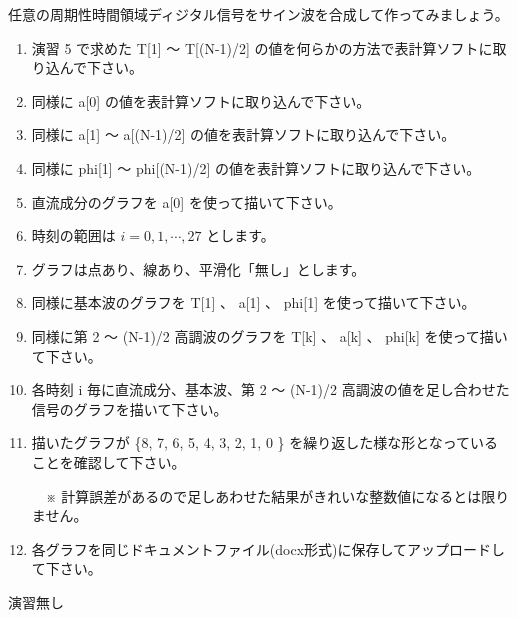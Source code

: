 \documentclass[a4paper]{jarticle}
\begin{document}
 任意の周期性時間領域ディジタル信号をサイン波を合成して作ってみましょう。\par
\vspace{1zh}
\begin{enumerate}
\item 演習 5 で求めた T[1] 〜 T[(N-1)/2] の値を何らかの方法で表計算ソフトに取り込んで下さい。
\item 同様に a[0] の値を表計算ソフトに取り込んで下さい。
\item 同様に a[1] 〜 a[(N-1)/2] の値を表計算ソフトに取り込んで下さい。
\item 同様に phi[1] 〜 phi[(N-1)/2] の値を表計算ソフトに取り込んで下さい。
\item 直流成分のグラフを a[0] を使って描いて下さい。
\item 時刻の範囲は $i = 0, 1,  \cdots, 27$ とします。
\item グラフは点あり、線あり、平滑化「無し」とします。
\item 同様に基本波のグラフを T[1] 、 a[1] 、 phi[1] を使って描いて下さい。
\item 同様に第 2 〜 (N-1)/2 高調波のグラフを T[k] 、 a[k] 、 phi[k] を使って描いて下さい。
\item 各時刻 i 毎に直流成分、基本波、第 2 〜 (N-1)/2 高調波の値を足し合わせた信号のグラフを描いて下さい。
\item 描いたグラフが \{8, 7, 6, 5, 4, 3, 2, 1, 0 \} を繰り返した様な形となっていることを確認して下さい。\par
　※ 計算誤差があるので足しあわせた結果がきれいな整数値になるとは限りません。
\item 各グラフを同じドキュメントファイル(docx形式)に保存してアップロードして下さい。
\end{enumerate}


\vspace{2zh}
\noindent 演習無し


\savepractime
\end{document}
